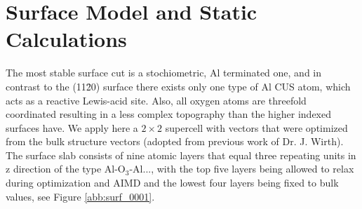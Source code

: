 \documentclass[11pt,DIV=13,BCOR=5mm,a4paper,headinclude]{scrbook}
\begin{document}
\section{Surface Model and Static Calculations}\label{sec_0001surf}
The most stable surface cut is a stochiometric, Al terminated one, and in contrast to the (11\=20) surface there exists only one type of Al CUS atom, which acts as a reactive Lewis-acid site.
Also, all oxygen atoms are threefold coordinated resulting in a less complex topography than the higher indexed surfaces have.
We apply here a $2\times 2$ supercell with vectors that were optimized from the bulk structure vectors (adopted from previous work of Dr. J. Wirth\cite{WirthJPCC2012}).
The surface slab consists of nine atomic layers that equal three repeating units in z direction of the type Al-O$_3$-Al..., with the top five layers being allowed to relax during optimization and AIMD and the lowest four layers being fixed to bulk values, see Figure \ref{abb:surf_0001}.
\end{document}

